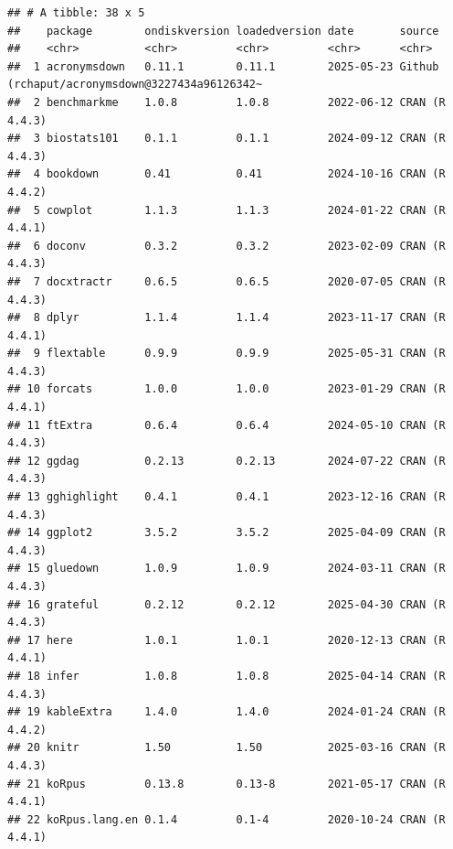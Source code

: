 \documentclass[
]{article}
\begin{document}
\begin{verbatim}
## # A tibble: 38 x 5
##    package        ondiskversion loadedversion date       source                                        
##    <chr>          <chr>         <chr>         <chr>      <chr>                                         
##  1 acronymsdown   0.11.1        0.11.1        2025-05-23 Github (rchaput/acronymsdown@3227434a96126342~
##  2 benchmarkme    1.0.8         1.0.8         2022-06-12 CRAN (R 4.4.3)                                
##  3 biostats101    0.1.1         0.1.1         2024-09-12 CRAN (R 4.4.3)                                
##  4 bookdown       0.41          0.41          2024-10-16 CRAN (R 4.4.2)                                
##  5 cowplot        1.1.3         1.1.3         2024-01-22 CRAN (R 4.4.1)                                
##  6 doconv         0.3.2         0.3.2         2023-02-09 CRAN (R 4.4.3)                                
##  7 docxtractr     0.6.5         0.6.5         2020-07-05 CRAN (R 4.4.3)                                
##  8 dplyr          1.1.4         1.1.4         2023-11-17 CRAN (R 4.4.1)                                
##  9 flextable      0.9.9         0.9.9         2025-05-31 CRAN (R 4.4.3)                                
## 10 forcats        1.0.0         1.0.0         2023-01-29 CRAN (R 4.4.1)                                
## 11 ftExtra        0.6.4         0.6.4         2024-05-10 CRAN (R 4.4.3)                                
## 12 ggdag          0.2.13        0.2.13        2024-07-22 CRAN (R 4.4.3)                                
## 13 gghighlight    0.4.1         0.4.1         2023-12-16 CRAN (R 4.4.3)                                
## 14 ggplot2        3.5.2         3.5.2         2025-04-09 CRAN (R 4.4.3)                                
## 15 gluedown       1.0.9         1.0.9         2024-03-11 CRAN (R 4.4.3)                                
## 16 grateful       0.2.12        0.2.12        2025-04-30 CRAN (R 4.4.3)                                
## 17 here           1.0.1         1.0.1         2020-12-13 CRAN (R 4.4.1)                                
## 18 infer          1.0.8         1.0.8         2025-04-14 CRAN (R 4.4.3)                                
## 19 kableExtra     1.4.0         1.4.0         2024-01-24 CRAN (R 4.4.2)                                
## 20 knitr          1.50          1.50          2025-03-16 CRAN (R 4.4.3)                                
## 21 koRpus         0.13.8        0.13-8        2021-05-17 CRAN (R 4.4.1)                                
## 22 koRpus.lang.en 0.1.4         0.1-4         2020-10-24 CRAN (R 4.4.1)                                

\end{verbatim}
\end{document}
